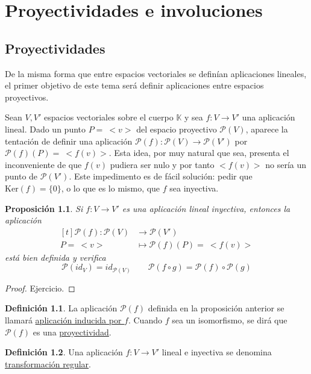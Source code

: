 \documentclass[12pt]{report}
\newtheorem{proposition}{Proposición}[chapter]
\theoremstyle{definition}
\newtheorem{definition}{Definición}[chapter]
\theoremstyle{definition}
\theoremstyle{remark}
\begin{document}
\chapter{Proyectividades e involuciones}

\section{Proyectividades}

De la misma forma que entre espacios vectoriales se definían aplicaciones lineales, el primer objetivo de este tema será definir aplicaciones entre espacios proyectivos.

\vspace{2mm}
Sean $V,V'$ espacios vectoriales sobre el cuerpo $\mathbb{K}$ y sea $f \colon V \to V'$ una aplicación lineal. Dado un punto $P = \ <v>$ del espacio proyectivo $\mathcal{P}(V)$, aparece la tentación de definir una aplicación $\mathcal{P}(f) \colon \mathcal{P}(V) \to \mathcal{P}(V')$ por $\mathcal{P}(f)(P) = \ <f(v)>$. Esta idea, por muy natural que sea, presenta el inconveniente de que $f(v)$ pudiera ser nulo y por tanto $<f(v)>$ no sería un punto de $\mathcal{P}(V')$. Este impedimento es de fácil solución: pedir que $\mathrm{Ker}(f) = \{0\}$, o lo que es lo mismo, que $f$ sea inyectiva.

\begin{proposition}
Si $f \colon V \to V'$ es una aplicación lineal inyectiva, entonces la aplicación
\[
\begin{aligned}[t]
\mathcal{P}(f) \colon \mathcal{P}(V) &\longrightarrow \mathcal{P}(V') \\
P = \ <v> \, &\longmapsto \mathcal{P}(f)(P) = \ <f(v)>
\end{aligned}
\]
está bien definida y verifica 
\[\mathcal{P}(id_V) = id_{\mathcal{P}(V)} \qquad \mathcal{P}(f \circ g) = \mathcal{P}(f) \circ \mathcal{P}(g)\]
\end{proposition}

\begin{proof}
    Ejercicio.
\end{proof}

\begin{definition}
La aplicación $\mathcal{P}(f)$ definida en la proposición anterior se llamará \ul{aplicación inducida por $f$}. Cuando $f$ sea un isomorfismo, se dirá que $\mathcal{P}(f)$ es una \ul{proyectividad}.
\end{definition}

\begin{definition}
    Una aplicación $f \colon V \to V'$ lineal e inyectiva se denomina \ul{transformación regular}.
\end{definition}
\end{document}
